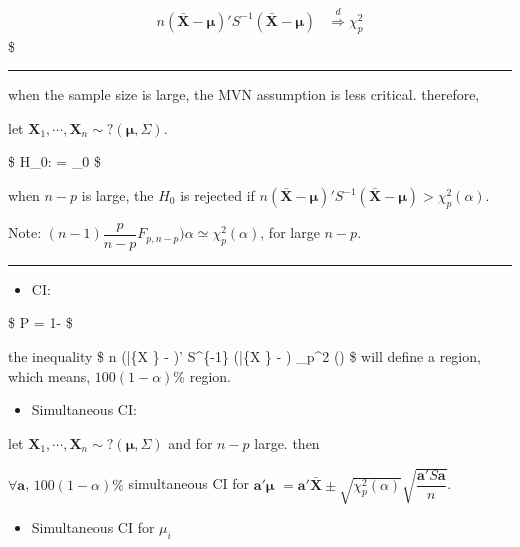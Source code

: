 \documentclass[
]{book}
\providecommand{\tightlist}{%
  \setlength{\itemsep}{0pt}\setlength{\parskip}{0pt}}
\begin{document}
{{{\begin{align*}
n (\bar {\pmb X} - \pmb \mu)' S^{-1}(\bar {\pmb X} - \pmb \mu) &\overset {d}{\Longrightarrow} \chi^2_p

\end{align*}
\$

\begin{center}\rule{0.5\linewidth}{0.5pt}\end{center}

when the sample size is large, the MVN assumption is less critical. therefore,

let \(\pmb X_1 , \cdots, \pmb X_n {\sim} ?(\pmb \mu, \Sigma)\).

\$
H\_0: \pmb \mu = \pmb \mu\_0
\$

when \(n-p\) is large, the \(H_0\) is rejected if \(n (\bar {\pmb X} - \pmb \mu)' S^{-1}(\bar {\pmb X} - \pmb \mu) > \chi^2_p (\alpha)\).

Note: \((n-1) \dfrac{p}{n-p} F_{p,n-p} )\alpha \simeq \chi_p^2(\alpha)\), for large \(n-p\).

\begin{center}\rule{0.5\linewidth}{0.5pt}\end{center}

\begin{itemize}
\tightlist
\item
  CI:
\end{itemize}

\$
P  
 = 1-\alpha
\$

the inequality \$ n (\bar \{\pmb X \} - \pmb \mu)' S\^{}\{-1\} (\bar \{\pmb X \} - \pmb \mu) \le \chi\_p\^{}2 (\alpha) \$ will define a region, which means, \(100(1-\alpha) \%\) region.

\begin{itemize}
\tightlist
\item
  Simultaneous CI:
\end{itemize}

let \(\pmb X_1 , \cdots, \pmb X_n {\sim} ?(\pmb \mu, \Sigma)\) and for \(n-p\) large. then

\(\forall \pmb a\), \(100(1-\alpha) \%\) simultaneous CI for \(\pmb a ' \pmb \mu\) \(= \pmb a ' \bar {\pmb X} \pm \sqrt{ \chi_p^2 (\alpha)} \sqrt{ \dfrac{\pmb a ' S \pmb a} {n}}\).

\begin{itemize}
\tightlist
\item
  Simultaneous CI for \(\mu_i\)
\end{itemize}

}}}
\end{document}
